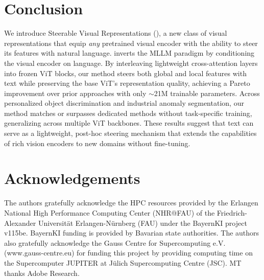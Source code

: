 \section{Conclusion}

We introduce Steerable Visual Representations (\model{}), a new class of visual representations that equip \textit{any} pretrained visual encoder with 
the ability to steer its features with natural language. 
\model{} inverts the 
MLLM
paradigm by conditioning the visual encoder on language.             
By interleaving lightweight cross-attention layers into frozen ViT blocks, our method steers both global and local features with text while preserving the base ViT's representation quality, achieving a Pareto improvement over prior approaches with only ${\sim}$21M trainable parameters.
Across personalized object discrimination and industrial anomaly segmentation, 
our method
matches or surpasses 
dedicated methods without task-specific training, generalizing across multiple ViT backbones.
These results suggest that text can serve as a lightweight, post-hoc steering mechanism that extends the capabilities of rich 
vision encoders to new domains without fine-tuning.


\section{Acknowledgements}
The authors gratefully acknowledge the HPC resources provided by the Erlangen National High Performance Computing Center (NHR@FAU) of the Friedrich-Alexander Universität Erlangen-Nürnberg (FAU) under the BayernKI project v115be. BayernKI funding is provided by Bavarian state authorities. The authors also gratefully acknowledge the Gauss Centre for Supercomputing e.V. (www.gauss-centre.eu) for funding this project by providing computing time on the Supercomputer JUPITER at Jülich Supercomputing Centre (JSC). MT thanks Adobe Research.